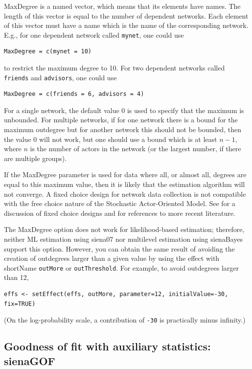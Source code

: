 \documentclass[a4paper,fleqn,11pt]{article}
\newcommand{\+}{\, + \,}
\newcommand{\saom}{{Stochastic Actor-Oriented Model}}
\begin{document}
\textsf{MaxDegree} is a named vector, which means that its elements
have names. The length of this vector
is equal to the number of dependent networks.
Each element of this vector must have a name
which is the name of the corresponding network.
E.g., for one dependent network called \texttt{mynet}, one could use
\begin{verbatim}
MaxDegree = c(mynet = 10)
\end{verbatim}
to restrict the maximum degree to 10.
For two dependent networks called \texttt{friends} and \texttt{advisors},
one could use
\begin{verbatim}
MaxDegree = c(friends = 6, advisors = 4)
\end{verbatim}

For a single network, the default value 0 is used
to specify that the maximum is unbounded.
For multiple networks, if for one network
there is a bound for the maximum outdegree
 but for another network this should not be bounded, then
 the value 0 will not work,
 but one should use a bound which is at least $n-1$,
where $n$ is the number of actors in the network (or the largest number,
if there are multiple groups).

If the \textsf{MaxDegree} parameter is used for data where
all, or almost all, degrees are equal to this maximum value,
then it is likely that the estimation algorithm will not converge.
A fixed choice design for network data collection is not
compatible with the free choice nature of the \saom.
See \citet{HollandLeinhardt1973} for a discussion of
fixed choice designs and \citet{Znidarsic2012}
for references to more recent literature.

The \textsf{MaxDegree} option does not work for likelihood-based
estimation; therefore, neither ML estimation using \textsf{siena07}
nor multilevel estimation using \textsf{sienaBayes} support
this option.
However, you can obtain the same result of avoiding the creation
of outdegrees larger than a given value by using the effect with shortName
\texttt{outMore} or \texttt{outThreshold}. For example, to avoid
outdegrees larger than 12,
\begin{verbatim}
effs <- setEffect(effs, outMore, parameter=12, initialValue=-30, fix=TRUE)
\end{verbatim}
(On the log-probability scale, a contribution of \verb!-30!  is
practically minus infinity.)

\newpage

\subsection{Goodness of fit with auxiliary statistics: \textsf{sienaGOF}}
\label{S_gof}
\end{document}
